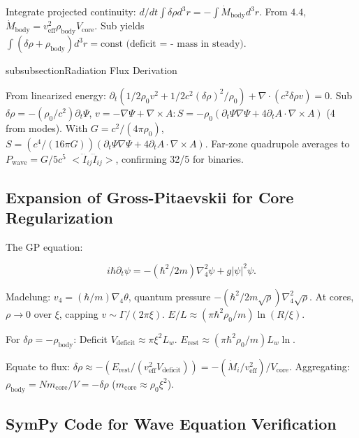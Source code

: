 \documentclass{article}
\begin{document}
Integrate projected continuity: $d/dt \int \delta \rho d^3 r = - \int \dot{M}_{\text{body}} d^3 r$. From $4.4$, $\dot{M}_{\text{body}} = v_{\text{eff}}^2 \rho_{\text{body}} V_{\text{core}}$. Sub yields $\int (\delta \rho + \rho_{\text{body}}) d^3 r = \text{const (deficit = - mass in steady)}$.

subsubsection{Radiation Flux Derivation}

From linearized energy: $\partial_t (1/2 \rho_0 v^2 + 1/2 c^2 (\delta \rho)^2 / \rho_0) + \nabla \cdot (c^2 \delta \rho v) = 0$. Sub $\delta \rho = - (\rho_0 / c^2) \partial_t \Psi$, $v = - \nabla \Psi + \nabla \times A: S = - \rho_0 (\partial_t \Psi \nabla \Psi + 4 \partial_t A \cdot \nabla \times A)$ (4 from modes). With $G = c^2 / (4\pi \rho_0)$, $S = (c^4 / (16\pi G)) (\partial_t \Psi \nabla \Psi + 4 \partial_t A \cdot \nabla \times A)$. Far-zone quadrupole averages to $P_{\text{wave}} = G/5 c^5$ $<\dddot I_{ij} \dddot I_{ij}>$, confirming 32/5 for binaries.

\subsection{Expansion of Gross-Pitaevskii for Core Regularization}

The GP equation:

\[
i \hbar \partial_t \psi = - (\hbar^2 / 2 m) \nabla_4^2 \psi + g | \psi |^2 \psi.
\]

Madelung: $v_4 = (\hbar / m) \nabla_4 \theta$, quantum pressure $- (\hbar^2 / 2 m \sqrt \rho) \nabla_4^2 \sqrt \rho$. At cores, $\rho \to 0$ over $\xi$, capping $v \sim \Gamma / (2\pi \xi)$. $E / L \approx (\pi \hbar^2 \rho_0 / m) \ln(R / \xi)$.

For $\delta \rho = - \rho_{\text{body}}$: Deficit $V_{\text{deficit}} \approx \pi \xi^2 L_w$. $E_{\text{rest}} \approx (\pi \hbar^2 \rho_0 / m) L_w \ln$.

Equate to flux: $\delta \rho \approx - (E_{\text{rest}} / (v_{\text{eff}}^2 V_{\text{deficit}})) = - (\dot M_i / v_{\text{eff}}^2) / V_{\text{core}}$. Aggregating: $\rho_{\text{body}} = N m_{\text{core}} / V = - \delta \rho$ ($m_{\text{core}} \approx \rho_0 \xi^2$).

\subsection{SymPy Code for Wave Equation Verification}
\end{document}
